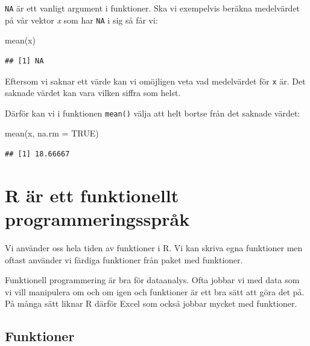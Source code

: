 \documentclass[
]{book}
\newenvironment{Shaded}{\begin{snugshade}}{\end{snugshade}}
\newcommand{\AttributeTok}[1]{\textcolor[rgb]{0.77,0.63,0.00}{#1}}
\newcommand{\ConstantTok}[1]{\textcolor[rgb]{0.00,0.00,0.00}{#1}}
\newcommand{\FunctionTok}[1]{\textcolor[rgb]{0.00,0.00,0.00}{#1}}
\newcommand{\NormalTok}[1]{#1}
\begin{document}
\texttt{NA} är ett vanligt argument i funktioner. Ska vi exempelvis beräkna medelvärdet på vår vektor \emph{x} som har \texttt{NA} i sig så får vi:

\begin{Shaded}
\begin{Highlighting}[]
\FunctionTok{mean}\NormalTok{(x)}
\end{Highlighting}
\end{Shaded}

\begin{verbatim}
## [1] NA
\end{verbatim}

Eftersom vi saknar ett värde kan vi omöjligen veta vad medelvärdet för \texttt{x} är. Det saknade värdet kan vara vilken siffra som helst.

Därför kan vi i funktionen \texttt{mean()} välja att helt bortse från det saknade värdet:

\begin{Shaded}
\begin{Highlighting}[]
\FunctionTok{mean}\NormalTok{(x, }\AttributeTok{na.rm =} \ConstantTok{TRUE}\NormalTok{)}
\end{Highlighting}
\end{Shaded}

\begin{verbatim}
## [1] 18.66667
\end{verbatim}

\hypertarget{r-uxe4r-ett-funktionellt-programmeringsspruxe5k}{%
\section{R är ett funktionellt programmeringsspråk}\label{r-uxe4r-ett-funktionellt-programmeringsspruxe5k}}

Vi använder oss hela tiden av funktioner i R. Vi kan skriva egna funktioner men oftast använder vi färdiga funktioner från paket med funktioner.

Funktionell programmering är bra för dataanalys. Ofta jobbar vi med data som vi vill manipulera om och om igen och funktioner är ett bra sätt att göra det på. På många sätt liknar R därför Excel som också jobbar mycket med funktioner.

\hypertarget{funktioner}{%
\subsection{Funktioner}\label{funktioner}}
\end{document}
